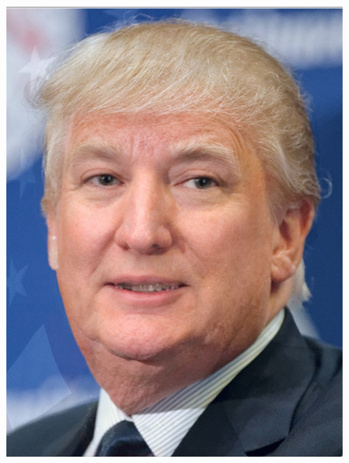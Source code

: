 \documentclass[a4paper]{article}
\begin{document}
\begin{figure}[htp]
{\begin{minipage}[b]{0.31\columnwidth}
{\includegraphics[width=1\columnwidth]{FTC.png}
}
\label{fig:3-5:c}
\end{minipage}
}
\hfil
{}
\end{figure}
\end{document}
